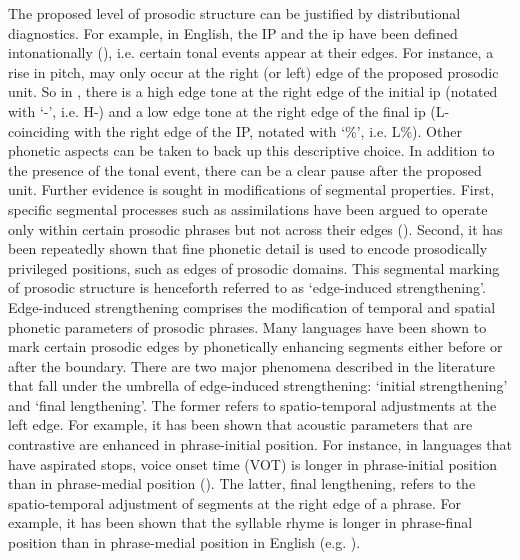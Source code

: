 The proposed level of prosodic structure can be justified by distributional diagnostics. For example, in English, the IP and the ip have been defined intonationally (\citealt{BeckmanPierr1986}), i.e. certain tonal events appear at their edges. For instance, a rise in pitch, may only occur at the right (or left) edge of the proposed prosodic unit. So in , there is a high edge tone at the right edge of the initial ip (notated with ‘-’, i.e. H-) and a low edge tone at the right edge of the final ip (L- coinciding with the right edge of the IP, notated with ‘\%’, i.e. L\%). Other phonetic aspects can be taken to back up this descriptive choice. In addition to the presence of the tonal event, there can be a clear pause after the proposed unit. Further evidence is sought in modifications of segmental properties. First, specific segmental processes such as assimilations have been argued to operate only within certain prosodic phrases but not across their edges (\citealt{NesporVogel1986}). Second, it has been repeatedly shown that fine phonetic detail is used to encode prosodically privileged positions, such as edges of prosodic domains. This segmental marking of prosodic structure is henceforth referred to as ‘edge-induced strengthening’. Edge-induced strengthening comprises the modification of temporal and spatial phonetic parameters of prosodic phrases. Many languages have been shown to mark certain prosodic edges by phonetically enhancing segments either before or after the boundary. There are two major phenomena described in the literature that fall under the umbrella of edge-induced strengthening: ‘initial strengthening’ and ‘final lengthening’. The former refers to spatio-temporal adjustments at the left edge. For example, it has been shown that acoustic parameters that are contrastive are enhanced in phrase-initial position. For instance, in languages that have aspirated stops, voice onset time (VOT) is longer in phrase-initial position than in phrase-medial position (\citealt{Cooper1991,PierrTalkin1992,Jun1993,ChoSun2000,Choi2003,Cole.etal2003}). The latter, final lengthening, refers to the spatio-temporal adjustment of segments at the right edge of a phrase. For example, it has been shown that the syllable rhyme is longer in phrase-final position than in phrase-medial position in English  (e.g. 
\citealt{TurkShattuck2007}). 

